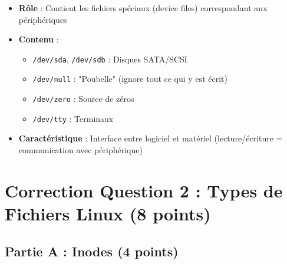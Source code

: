 \documentclass[12pt,a4paper]{article}
\begin{document}
\begin{answerbox}
\begin{itemize}
    \item \textbf{Rôle} : Contient les fichiers spéciaux (device files) correspondant aux périphériques
    \item \textbf{Contenu} :
    \begin{itemize}
        \item \texttt{/dev/sda}, \texttt{/dev/sdb} : Disques SATA/SCSI
        \item \texttt{/dev/null} : "Poubelle" (ignore tout ce qui y est écrit)
        \item \texttt{/dev/zero} : Source de zéros
        \item \texttt{/dev/tty} : Terminaux
    \end{itemize}
    \item \textbf{Caractéristique} : Interface entre logiciel et matériel (lecture/écriture = communication avec périphérique)
\end{itemize}
\end{answerbox}

\newpage


\section{Correction Question 2 : Types de Fichiers Linux (8 points)}

\subsection*{Partie A : Inodes (4 points)}
\end{document}
